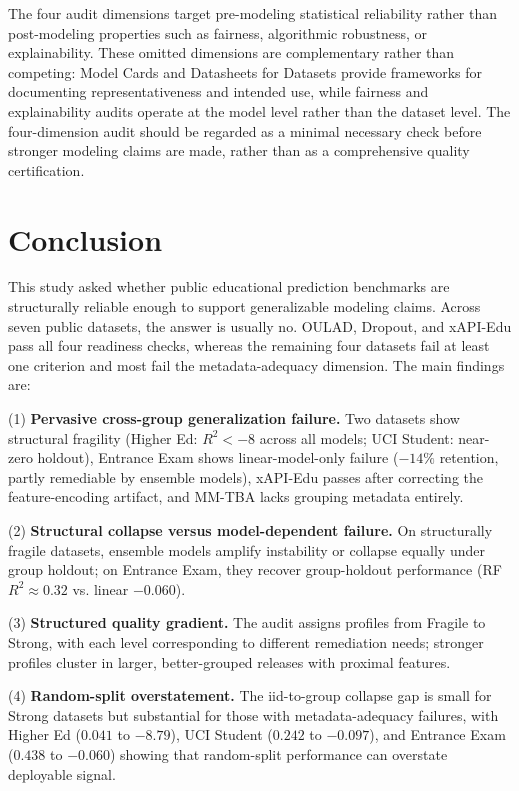 \documentclass[10pt,letterpaper]{wlscirep}
\begin{document}
The four audit dimensions target pre-modeling statistical reliability rather than post-modeling properties such as fairness, algorithmic robustness, or explainability. These omitted dimensions are complementary rather than competing: Model Cards \citep{Mitchell2019} and Datasheets for Datasets \citep{Gebru2021} provide frameworks for documenting representativeness and intended use, while fairness and explainability audits operate at the model level rather than the dataset level. The four-dimension audit should be regarded as a minimal necessary check before stronger modeling claims are made, rather than as a comprehensive quality certification.

\section{Conclusion}

This study asked whether public educational prediction benchmarks are structurally reliable enough to support generalizable modeling claims. Across seven public datasets, the answer is usually no. OULAD, Dropout, and xAPI-Edu pass all four readiness checks, whereas the remaining four datasets fail at least one criterion and most fail the metadata-adequacy dimension. The main findings are:

(1) \textbf{Pervasive cross-group generalization failure.} Two datasets show structural fragility (Higher Ed: $R^2 < -8$ across all models; UCI Student: near-zero holdout), Entrance Exam shows linear-model-only failure ($-14\%$ retention, partly remediable by ensemble models), xAPI-Edu passes after correcting the feature-encoding artifact, and MM-TBA lacks grouping metadata entirely.

(2) \textbf{Structural collapse versus model-dependent failure.} On structurally fragile datasets, ensemble models amplify instability or collapse equally under group holdout; on Entrance Exam, they recover group-holdout performance (RF $R^2 \approx 0.32$ vs. linear $-0.060$).

(3) \textbf{Structured quality gradient.} The audit assigns profiles from Fragile to Strong, with each level corresponding to different remediation needs; stronger profiles cluster in larger, better-grouped releases with proximal features.

(4) \textbf{Random-split overstatement.} The iid-to-group collapse gap is small for Strong datasets but substantial for those with metadata-adequacy failures, with Higher Ed ($0.041$ to $-8.79$), UCI Student ($0.242$ to $-0.097$), and Entrance Exam ($0.438$ to $-0.060$) showing that random-split performance can overstate deployable signal.
\end{document}

